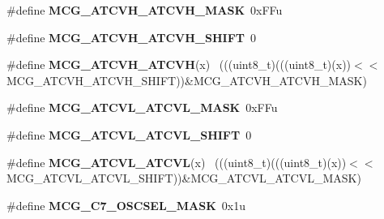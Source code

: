 \begin{DoxyCompactItemize}
\item 
\hypertarget{group___m_c_g___register___masks_gaf989f84acb1a8c91c7c98c2255651b00}{}\#define {\bfseries M\+C\+G\+\_\+\+A\+T\+C\+V\+H\+\_\+\+A\+T\+C\+V\+H\+\_\+\+M\+A\+S\+K}~0x\+F\+Fu\label{group___m_c_g___register___masks_gaf989f84acb1a8c91c7c98c2255651b00}

\item 
\hypertarget{group___m_c_g___register___masks_ga0fec2d450a98ab78dc7a2e4e9e33dbc6}{}\#define {\bfseries M\+C\+G\+\_\+\+A\+T\+C\+V\+H\+\_\+\+A\+T\+C\+V\+H\+\_\+\+S\+H\+I\+F\+T}~0\label{group___m_c_g___register___masks_ga0fec2d450a98ab78dc7a2e4e9e33dbc6}

\item 
\hypertarget{group___m_c_g___register___masks_gabc2689bb75b7c4cc672293dd43cdcc9d}{}\#define {\bfseries M\+C\+G\+\_\+\+A\+T\+C\+V\+H\+\_\+\+A\+T\+C\+V\+H}(x)                                          ~(((uint8\+\_\+t)(((uint8\+\_\+t)(x))$<$$<$M\+C\+G\+\_\+\+A\+T\+C\+V\+H\+\_\+\+A\+T\+C\+V\+H\+\_\+\+S\+H\+I\+F\+T))\&M\+C\+G\+\_\+\+A\+T\+C\+V\+H\+\_\+\+A\+T\+C\+V\+H\+\_\+\+M\+A\+S\+K)\label{group___m_c_g___register___masks_gabc2689bb75b7c4cc672293dd43cdcc9d}

\item 
\hypertarget{group___m_c_g___register___masks_ga48750526150212b524f731e303a7e3cf}{}\#define {\bfseries M\+C\+G\+\_\+\+A\+T\+C\+V\+L\+\_\+\+A\+T\+C\+V\+L\+\_\+\+M\+A\+S\+K}~0x\+F\+Fu\label{group___m_c_g___register___masks_ga48750526150212b524f731e303a7e3cf}

\item 
\hypertarget{group___m_c_g___register___masks_ga9e3e0eab24aaf1bf2905ae0cf4803eb3}{}\#define {\bfseries M\+C\+G\+\_\+\+A\+T\+C\+V\+L\+\_\+\+A\+T\+C\+V\+L\+\_\+\+S\+H\+I\+F\+T}~0\label{group___m_c_g___register___masks_ga9e3e0eab24aaf1bf2905ae0cf4803eb3}

\item 
\hypertarget{group___m_c_g___register___masks_gac69adca2b6c2222d1f35d7194b82ee41}{}\#define {\bfseries M\+C\+G\+\_\+\+A\+T\+C\+V\+L\+\_\+\+A\+T\+C\+V\+L}(x)                                          ~(((uint8\+\_\+t)(((uint8\+\_\+t)(x))$<$$<$M\+C\+G\+\_\+\+A\+T\+C\+V\+L\+\_\+\+A\+T\+C\+V\+L\+\_\+\+S\+H\+I\+F\+T))\&M\+C\+G\+\_\+\+A\+T\+C\+V\+L\+\_\+\+A\+T\+C\+V\+L\+\_\+\+M\+A\+S\+K)\label{group___m_c_g___register___masks_gac69adca2b6c2222d1f35d7194b82ee41}

\item 
\hypertarget{group___m_c_g___register___masks_ga8f29d6e2e3ddd8725de2ea86d8f0548f}{}\#define {\bfseries M\+C\+G\+\_\+\+C7\+\_\+\+O\+S\+C\+S\+E\+L\+\_\+\+M\+A\+S\+K}~0x1u\label{group___m_c_g___register___masks_ga8f29d6e2e3ddd8725de2ea86d8f0548f}


\end{DoxyCompactItemize}
